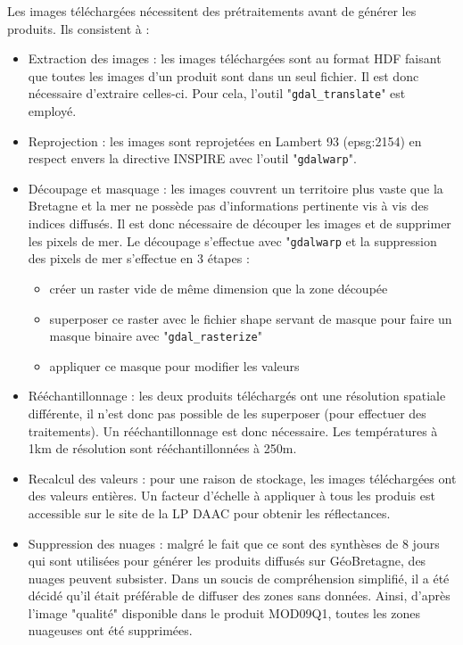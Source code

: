 \documentclass[10pt,a4paper]{article}
\begin{document}
Les images téléchargées nécessitent des prétraitements avant de générer les produits. Ils consistent à :

\begin{itemize}
\item Extraction des images : les images téléchargées sont au format HDF faisant que toutes les images d'un produit sont dans un seul fichier. Il est donc nécessaire d'extraire celles-ci. Pour cela, l'outil "\verb!gdal_translate!" est employé. 
\item Reprojection : les images sont reprojetées en Lambert 93 (epsg:2154) en respect envers la directive INSPIRE avec l'outil "\verb!gdalwarp!".
\item Découpage et masquage : les images couvrent un territoire plus vaste que la Bretagne et la mer ne possède pas d'informations pertinente vis à vis des indices diffusés. Il est donc nécessaire de découper les images et de supprimer les pixels de mer. Le découpage s'effectue avec "\verb!gdalwarp! et la suppression des pixels de mer s'effectue en 3 étapes :
\begin{itemize}
\item créer un raster vide de même dimension que la zone découpée
\item superposer ce raster avec le fichier shape servant de masque pour faire un masque binaire avec "\verb!gdal_rasterize!"
\item appliquer ce masque pour modifier les valeurs
\end{itemize}
\item Rééchantillonnage : les deux produits téléchargés ont une résolution spatiale différente, il n'est donc pas possible de les superposer (pour effectuer des traitements). Un rééchantillonnage est donc nécessaire. Les températures à 1km de résolution sont rééchantillonnées à 250m.
\item Recalcul des valeurs : pour une raison de stockage, les images téléchargées ont des valeurs entières. Un facteur d’échelle à appliquer à tous les produis est accessible sur le site de la LP DAAC pour obtenir les réflectances.
\item Suppression des nuages : malgré le fait que ce sont des synthèses de 8 jours qui sont utilisées pour générer les produits diffusés sur GéoBretagne, des nuages peuvent subsister. Dans un soucis de compréhension simplifié, il a été décidé qu'il était préférable de diffuser des zones sans données. Ainsi, d'après l'image "qualité" disponible dans le produit MOD09Q1, toutes les zones nuageuses ont été supprimées.
\end{itemize}
\end{document}
